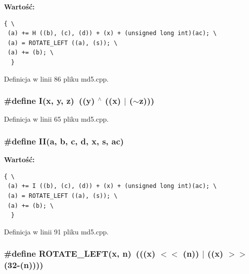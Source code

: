 \textbf{Wartość:}

\begin{Code}\begin{verbatim}{ \
 (a) += H ((b), (c), (d)) + (x) + (unsigned long int)(ac); \
 (a) = ROTATE_LEFT ((a), (s)); \
 (a) += (b); \
  }
\end{verbatim}
\end{Code}


Definicja w linii 86 pliku md5.cpp.\hypertarget{a00009_c0eafdc9ee161b71e7af98af736952fd}{
\subsubsection[{I}]{\setlength{\rightskip}{0pt plus 5cm}\#define I(x, \/  y, \/  z)~((y) $^\wedge$ ((x) $|$ ($\sim$z)))}}
\label{da/da0/a00009_c0eafdc9ee161b71e7af98af736952fd}




Definicja w linii 65 pliku md5.cpp.\hypertarget{a00009_d26626e5efb37b2dadef4e88e35e4329}{
\subsubsection[{II}]{\setlength{\rightskip}{0pt plus 5cm}\#define II(a, \/  b, \/  c, \/  d, \/  x, \/  s, \/  ac)}}
\label{da/da0/a00009_d26626e5efb37b2dadef4e88e35e4329}


\textbf{Wartość:}

\begin{Code}\begin{verbatim}{ \
 (a) += I ((b), (c), (d)) + (x) + (unsigned long int)(ac); \
 (a) = ROTATE_LEFT ((a), (s)); \
 (a) += (b); \
  }
\end{verbatim}
\end{Code}


Definicja w linii 91 pliku md5.cpp.\hypertarget{a00009_7417fd4e875360c0533fa5b412cdab49}{
\subsubsection[{ROTATE\_\-LEFT}]{\setlength{\rightskip}{0pt plus 5cm}\#define ROTATE\_\-LEFT(x, \/  n)~(((x) $<$$<$ (n)) $|$ ((x) $>$$>$ (32-(n))))}}
\label{da/da0/a00009_7417fd4e875360c0533fa5b412cdab49}




